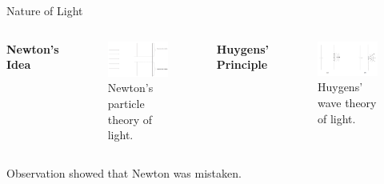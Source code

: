 \begin{frame}{Nature of Light}
  \vspace{0.5cm}
  \begin{columns}
    \textbf{Newton's Idea}
    \begin{figure}
      \centering
      \includegraphics[width=\textwidth]{Figures/Fig1.pdf}
      \caption{Newton's particle theory of light.}
    \end{figure}

    \textbf{Huygens' Principle}
    \begin{figure}
      \centering
      \includegraphics[width=\textwidth]{Figures/Fig5.pdf}
      \caption{Huygens' wave theory of light.}
    \end{figure}
  \end{columns}

  \vspace{0.5cm}
  \centering
  Observation showed that Newton was mistaken. \cite{Simeonov2024}
\end{frame}


